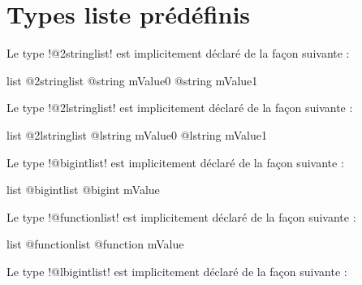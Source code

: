 \section{Types liste prédéfinis}


Le type \ggst!@2stringlist! est implicitement déclaré de la façon suivante :

\begin{galgas3box}
list @2stringlist {
  @string mValue0
  @string mValue1
}
\end{galgas3box}









Le type \ggst!@2lstringlist! est implicitement déclaré de la façon suivante :

\begin{galgas3box}
list @2lstringlist {
  @lstring mValue0
  @lstring mValue1
}
\end{galgas3box}









Le type \ggst!@bigintlist! est implicitement déclaré de la façon suivante :

\begin{galgas3box}
list @bigintlist {
  @bigint mValue
}
\end{galgas3box}









Le type \ggst!@functionlist! est implicitement déclaré de la façon suivante :

\begin{galgas3box}
list @functionlist {
  @function mValue
}
\end{galgas3box}









Le type \ggst!@lbigintlist! est implicitement déclaré de la façon suivante :

